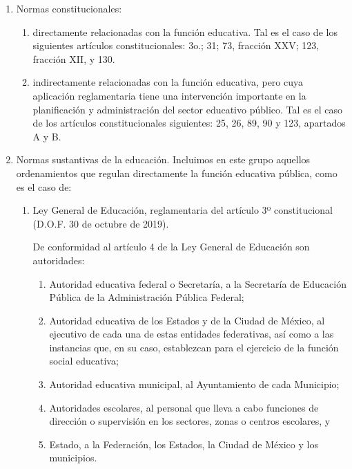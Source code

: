 \documentclass[
  12,
]{scrartcl}
\providecommand{\tightlist}{%
  \setlength{\itemsep}{0pt}\setlength{\parskip}{0pt}}
\begin{document}
\begin{enumerate}
\def\labelenumi{\alph{enumi})}
\item
  Normas constitucionales:

  \begin{enumerate}
  \def\labelenumii{\alph{enumii})}
  \item
    directamente relacionadas con la función educativa. Tal es el caso
    de los siguientes artículos constitucionales: 3o.; 31; 73, fracción
    XXV; 123, fracción XII, y 130.
  \item
    indirectamente relacionadas con la función educativa, pero cuya
    aplicación reglamentaria tiene una intervención importante en la
    planificación y administración del sector educativo público. Tal es
    el caso de los artículos constitucionales siguientes: 25, 26, 89, 90
    y 123, apartados A y B.
  \end{enumerate}
\item
  Normas sustantivas de la educación. Incluimos en este grupo aquellos
  ordenamientos que regulan directamente la función educativa pública,
  como es el caso de:

  \begin{enumerate}
  \def\labelenumii{\arabic{enumii}.}
  \item
    Ley General de Educación, reglamentaria del artículo 3º
    constitucional (D.O.F. 30 de octubre de 2019).

    De conformidad al artículo 4 de la Ley General de Educación son
    autoridades:

    \begin{enumerate}
    \def\labelenumiii{\arabic{enumiii})}
    \tightlist
    \item
      Autoridad educativa federal o Secretaría, a la Secretaría de
      Educación Pública de la Administración Pública Federal;
    \item
      Autoridad educativa de los Estados y de la Ciudad de México, al
      ejecutivo de cada una de estas entidades federativas, así como a
      las instancias que, en su caso, establezcan para el ejercicio de
      la función social educativa;
    \item
      Autoridad educativa municipal, al Ayuntamiento de cada Municipio;
    \item
      Autoridades escolares, al personal que lleva a cabo funciones de
      dirección o supervisión en los sectores, zonas o centros
      escolares, y
    \item
      Estado, a la Federación, los Estados, la Ciudad de México y los
      municipios.
    \end{enumerate}


\end{enumerate}
\end{enumerate}
\end{document}
